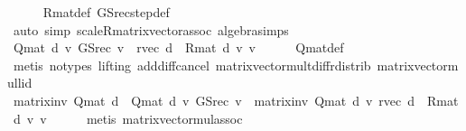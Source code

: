 \begin{isabellebody}
\ \ \ \ \isamarkupfalse%
\ R{\isacharunderscore}{\kern0pt}mat{\isacharunderscore}{\kern0pt}def\ GS{\isacharunderscore}{\kern0pt}rec{\isacharunderscore}{\kern0pt}step{\isacharunderscore}{\kern0pt}def\isanewline
\ \ \ \ \isamarkupfalse%
\ {\isacharparenleft}{\kern0pt}auto\ simp{\isacharcolon}{\kern0pt}\ scaleR{\isacharunderscore}{\kern0pt}matrix{\isacharunderscore}{\kern0pt}vector{\isacharunderscore}{\kern0pt}assoc\ algebra{\isacharunderscore}{\kern0pt}simps{\isacharparenright}{\kern0pt}\isanewline
\ \ \isamarkupfalse%
\ {\isachardoublequoteopen}Q{\isacharunderscore}{\kern0pt}mat\ d\ {\isacharasterisk}{\kern0pt}v\ GS{\isacharunderscore}{\kern0pt}rec\ v\ {\isacharequal}{\kern0pt}\ r{\isacharunderscore}{\kern0pt}vec\ d\ {\isacharplus}{\kern0pt}\ R{\isacharunderscore}{\kern0pt}mat\ d\ {\isacharasterisk}{\kern0pt}v\ v{\isachardoublequoteclose}\isanewline
\ \ \ \ \isamarkupfalse%
\ Q{\isacharunderscore}{\kern0pt}mat{\isacharunderscore}{\kern0pt}def\isanewline
\ \ \ \ \isamarkupfalse%
\ {\isacharparenleft}{\kern0pt}metis\ {\isacharparenleft}{\kern0pt}no{\isacharunderscore}{\kern0pt}types{\isacharcomma}{\kern0pt}\ lifting{\isacharparenright}{\kern0pt}\ add{\isacharunderscore}{\kern0pt}diff{\isacharunderscore}{\kern0pt}cancel\ matrix{\isacharunderscore}{\kern0pt}vector{\isacharunderscore}{\kern0pt}mult{\isacharunderscore}{\kern0pt}diff{\isacharunderscore}{\kern0pt}rdistrib\ matrix{\isacharunderscore}{\kern0pt}vector{\isacharunderscore}{\kern0pt}mul{\isacharunderscore}{\kern0pt}lid{\isacharparenright}{\kern0pt}\isanewline
\ \ \isamarkupfalse%
\ {\isachardoublequoteopen}{\isacharparenleft}{\kern0pt}matrix{\isacharunderscore}{\kern0pt}inv\ {\isacharparenleft}{\kern0pt}Q{\isacharunderscore}{\kern0pt}mat\ d{\isacharparenright}{\kern0pt}\ {\isacharasterisk}{\kern0pt}{\isacharasterisk}{\kern0pt}\ Q{\isacharunderscore}{\kern0pt}mat\ d{\isacharparenright}{\kern0pt}\ {\isacharasterisk}{\kern0pt}v\ GS{\isacharunderscore}{\kern0pt}rec\ v\ {\isacharequal}{\kern0pt}\ matrix{\isacharunderscore}{\kern0pt}inv\ {\isacharparenleft}{\kern0pt}Q{\isacharunderscore}{\kern0pt}mat\ d{\isacharparenright}{\kern0pt}\ {\isacharasterisk}{\kern0pt}v\ {\isacharparenleft}{\kern0pt}r{\isacharunderscore}{\kern0pt}vec\ d\ {\isacharplus}{\kern0pt}\ R{\isacharunderscore}{\kern0pt}mat\ d\ {\isacharasterisk}{\kern0pt}v\ v{\isacharparenright}{\kern0pt}{\isachardoublequoteclose}\isanewline
\ \ \ \ \isamarkupfalse%
\ {\isacharparenleft}{\kern0pt}metis\ matrix{\isacharunderscore}{\kern0pt}vector{\isacharunderscore}{\kern0pt}mul{\isacharunderscore}{\kern0pt}assoc{\isacharparenright}{\kern0pt}\isanewline

\end{isabellebody}
